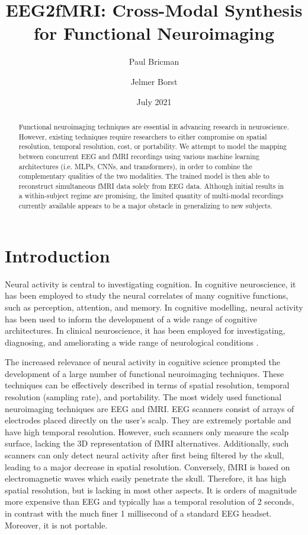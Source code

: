 \documentclass{article}
\title{EEG2fMRI: Cross-Modal Synthesis for Functional Neuroimaging}
\author{Paul Bricman}
\author{Jelmer Borst}
\affil{University of Groningen}
\date{July 2021}
\begin{document}
\maketitle

\begin{abstract}
    Functional neuroimaging techniques are essential in advancing research in neuroscience. However, existing techniques require researchers to either compromise on spatial resolution, temporal resolution, cost, or portability. We attempt to model the  mapping between concurrent EEG and fMRI recordings using various machine learning architectures (i.e. MLPs, CNNs, and transformers), in order to combine the complementary qualities of the two modalities. The trained model is then able to reconstruct simultaneous fMRI data solely from EEG data. Although initial results in a within-subject regime are promising, the limited quantity of multi-modal recordings currently available appears to be a major obstacle in generalizing to new subjects.
\end{abstract}

\section{Introduction}

Neural activity is central to investigating cognition. In cognitive neuroscience, it has been employed to study the neural correlates of many cognitive functions, such as perception, attention, and memory. In cognitive modelling, neural activity has been used to inform the development of a wide range of cognitive architectures. In clinical neuroscience, it has been employed for investigating, diagnosing, and ameliorating a wide range of neurological conditions \cite{n_functional_2015}.

The increased relevance of neural activity in cognitive science prompted the development of a large number of functional neuroimaging techniques. These techniques can be effectively described in terms of spatial resolution, temporal resolution (sampling rate), and portability. The most widely used functional neuroimaging techniques are EEG and fMRI. EEG scanners consist of arrays of electrodes placed directly on the user's scalp. They are extremely portable and have high temporal resolution. However, such scanners only measure the scalp surface, lacking the 3D representation of fMRI alternatives. Additionally, such scanners can only detect neural activity after first being filtered by the skull, leading to a major decrease in spatial resolution. Conversely, fMRI is based on electromagnetic waves which easily penetrate the skull. Therefore, it has high spatial resolution, but is lacking in most other aspects. It is orders of magnitude more expensive than EEG and typically has a temporal resolution of 2 seconds, in contrast with the much finer 1 millisecond of a standard EEG headset. Moreover, it is not portable.
\end{document}
